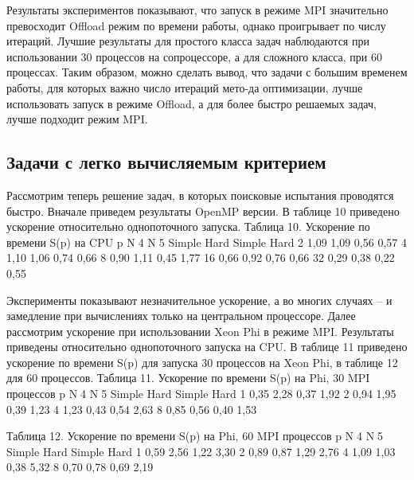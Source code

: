 Результаты экспериментов показывают, что запуск в режиме MPI значительно превосходит Offload режим по времени работы, однако проигрывает по числу итераций. Лучшие результаты для простого класса задач наблюдаются при использовании 30 процессов на сопроцессоре, а для сложного класса, при 60 процессах. Таким образом, можно сделать вывод, что задачи с большим временем работы, для которых важно число итераций мето-да оптимизации, лучше использовать запуск в режиме Offload, а для более быстро решаемых задач, лучше подходит режим MPI. 
\subsection{Задачи с легко вычисляемым критерием}
Рассмотрим теперь решение задач, в которых поисковые испытания проводятся быстро. Вначале приведем результаты OpenMP версии. В таблице 10 приведено ускорение относительно однопоточного запуска.
Таблица 10. Ускорение по времени S(p) на CPU
p	N4	N5
	Simple	Hard	Simple	Hard
2	1,09	1,09	0,56	0,57
4	1,10	1,06	0,74	0,66
8	0,90	1,11	0,45	1,77
16	0,66	0,92	0,76	0,66
32	0,29	0,38	0,22	0,55

Эксперименты показывают незначительное ускорение, а во многих случаях – и замедление при вычислениях только на центральном процессоре.
Далее рассмотрим ускорение при использовании Xeon Phi в режиме MPI. Результаты приведены относительно однопоточного запуска на CPU. В таблице 11 приведено ускорение по времени S(p) для запуска 30 процессов на Xeon Phi, в таблице 12 для 60 процессов.
Таблица 11. Ускорение по времени S(p) на Phi, 30 MPI процессов
p	N4	N5
	Simple	Hard	Simple	Hard
1	0,35	2,28	0,37	1,92
2	0,94	1,95	0,39	1,23
4	1,23	0,43	0,54	2,63
8	0,85	0,56	0,40	1,53




Таблица 12. Ускорение по времени S(p) на Phi, 60 MPI процессов
p	N4	N5
	Simple	Hard	Simple	Hard
1	0,59	2,56	1,22	3,30
2	0,89	0,87	1,29	2,76
4	1,09	1,03	0,38	5,32
8	0,70	0,78	0,69	2,19


